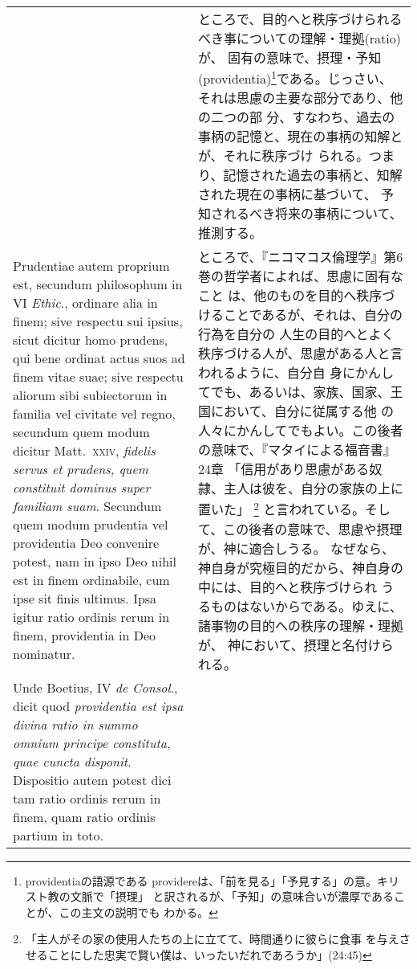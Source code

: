 \documentclass[10pt]{jsarticle} %
\begin{document}
\begin{longtable}{p{21em}p{21em}}
&

ところで、目的へと秩序づけられるべき事についての理解・理拠(ratio)が、
固有の意味で、摂理・予知(providentia)\footnote{providentiaの語源である
providereは、「前を見る」「予見する」の意。キリスト教の文脈で「摂理」
と訳されるが、「予知」の意味合いが濃厚であることが、この主文の説明でも
わかる。}である。じっさい、それは思慮の主要な部分であり、他の二つの部
分、すなわち、過去の事柄の記憶と、現在の事柄の知解とが、それに秩序づけ
られる。つまり、記憶された過去の事柄と、知解された現在の事柄に基づいて、
予知されるべき将来の事柄について、推測する。

\\

Prudentiae autem
proprium est, secundum philosophum in VI {\itshape Ethic}., ordinare alia in finem;
sive respectu sui ipsius, sicut dicitur homo prudens, qui bene ordinat
actus suos ad finem vitae suae; sive respectu aliorum sibi subiectorum
in familia vel civitate vel regno, secundum quem modum dicitur
Matt.~{\scshape xxiv}, {\itshape fidelis servus et prudens, quem constituit dominus super
familiam suam}. Secundum quem modum prudentia vel providentia Deo
convenire potest, nam in ipso Deo nihil est in finem ordinabile, cum
ipse sit finis ultimus. Ipsa igitur ratio ordinis rerum in finem,
 providentia in Deo nominatur.
 
&

ところで、『ニコマコス倫理学』第6巻の哲学者によれば、思慮に固有なこと
は、他のものを目的へ秩序づけることであるが、それは、自分の行為を自分の
人生の目的へとよく秩序づける人が、思慮がある人と言われるように、自分自
身にかんしてでも、あるいは、家族、国家、王国において、自分に従属する他
の人々にかんしてでもよい。この後者の意味で、『マタイによる福音書』24章
「信用があり思慮がある奴隷、主人は彼を、自分の家族の上に置いた」
\footnote{「主人がその家の使用人たちの上に立てて、時間通りに彼らに食事
を与えさせることにした忠実で賢い僕は、いったいだれであろうか」(24:45)}
と言われている。そして、この後者の意味で、思慮や摂理が、神に適合しうる。
なぜなら、神自身が究極目的だから、神自身の中には、目的へと秩序づけられ
うるものはないからである。ゆえに、諸事物の目的への秩序の理解・理拠が、
神において、摂理と名付けられる。


\\

Unde Boetius, IV {\itshape de Consol}., dicit quod
{\itshape providentia est ipsa divina ratio in summo omnium principe constituta,
quae cuncta disponit}. Dispositio autem potest dici tam ratio ordinis
rerum in finem, quam ratio ordinis partium in toto.


\end{longtable}
\end{document}
